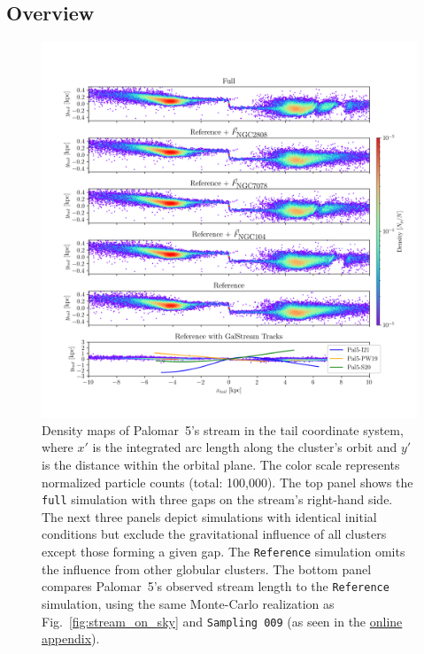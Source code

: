     \subsection{Overview}
        \begin{figure}
            \centering
            \includegraphics[width=\linewidth]{images/decomposition-monte-carlo-009-with-3-gaps-domidpoint-shift.png}
            \caption{Density maps of Palomar~5's stream in the tail coordinate system, where $x\prime$ is the integrated arc length along the cluster's orbit and $y\prime$ is the distance within the orbital plane. The color scale represents normalized particle counts (total: 100,000). The top panel shows the \texttt{full} simulation with three gaps on the stream's right-hand side. The next three panels depict simulations with identical initial conditions but exclude the gravitational influence of all clusters except those forming a given gap. The \texttt{Reference} simulation omits the influence from other globular clusters. The bottom panel compares Palomar~5's observed stream length to the \texttt{Reference} simulation, using the same Monte-Carlo realization as Fig.~\ref{fig:stream_on_sky} and \texttt{Sampling~009} (as seen in the \href{https://doi.org/10.5281/zenodo.15528089}{online appendix}).}
            \label{fig:decomposition}
        \end{figure} 
    
